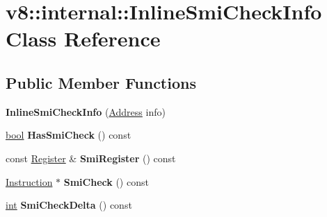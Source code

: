 \hypertarget{classv8_1_1internal_1_1InlineSmiCheckInfo}{}\section{v8\+:\+:internal\+:\+:Inline\+Smi\+Check\+Info Class Reference}
\label{classv8_1_1internal_1_1InlineSmiCheckInfo}
\subsection*{Public Member Functions}
\begin{DoxyCompactItemize}
\item 
\mbox{\label{classv8_1_1internal_1_1InlineSmiCheckInfo_ab647b236c0ca96e8e48c31309101ffd3}} 
{\bfseries Inline\+Smi\+Check\+Info} (\mbox{\hyperlink{classuintptr__t}{Address}} info)
\item 
\mbox{\label{classv8_1_1internal_1_1InlineSmiCheckInfo_ae043ed618b4354a419aeb5aebb07c7c7}} 
\mbox{\hyperlink{classbool}{bool}} {\bfseries Has\+Smi\+Check} () const
\item 
\mbox{\label{classv8_1_1internal_1_1InlineSmiCheckInfo_a5a1cabc3b33deaa078401f0f0b020d41}} 
const \mbox{\hyperlink{classv8_1_1internal_1_1Register}{Register}} \& {\bfseries Smi\+Register} () const
\item 
\mbox{\label{classv8_1_1internal_1_1InlineSmiCheckInfo_adfb84b9dad2410fd13d5ea17673f8c07}} 
\mbox{\hyperlink{classv8_1_1internal_1_1Instruction}{Instruction}} $\ast$ {\bfseries Smi\+Check} () const
\item 
\mbox{\label{classv8_1_1internal_1_1InlineSmiCheckInfo_af89b45e0fd748900463d13cfa51daac1}} 
\mbox{\hyperlink{classint}{int}} {\bfseries Smi\+Check\+Delta} () const
\end{DoxyCompactItemize}
